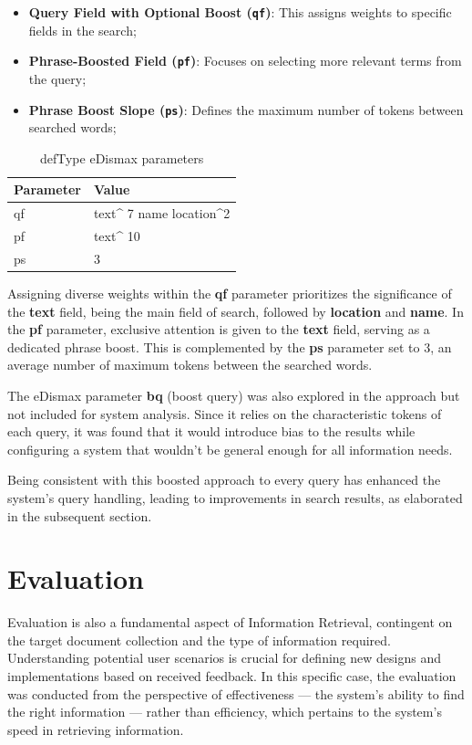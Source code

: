 \documentclass[sigconf]{acmart}
\begin{document}
\begin{itemize}
    \item \textbf{Query Field with Optional Boost (\texttt{qf})}: This assigns weights to specific fields in the search;
    \item \textbf{Phrase-Boosted Field (\texttt{pf})}: Focuses on selecting more relevant terms from the query;
    \item \textbf{Phrase Boost Slope (\texttt{ps})}: Defines the maximum number of tokens between searched words;
\end{itemize}

\begin{table}[H]
\small
\caption{defType eDismax parameters}
\label{tab:edismax_par}
\begin{tabular}{ll}
\toprule
Parameter & Value\\
\midrule
qf & text\textasciicircum{} 7 name location\textasciicircum{}2
  \\
pf & text\textasciicircum{} 10 \\
ps & 3 \\
\bottomrule
\end{tabular}
\end{table}

Assigning diverse weights within the \textbf{qf} parameter prioritizes the significance of the \textbf{text} field, being the main field of search, followed by \textbf{location} and \textbf{name}. In the \textbf{pf} parameter, exclusive attention is given to the \textbf{text} field, serving as a dedicated phrase boost. This is complemented by the \textbf{ps} parameter set to 3, an average number of maximum tokens between the searched words.

The eDismax parameter \textbf{bq} (boost query) was also explored in the approach but not included for system analysis. Since it relies on the characteristic tokens of each query, it was found that it would introduce bias to the results while configuring a system that wouldn't be general enough for all information needs.

Being consistent with this boosted approach to every query has enhanced the system's query handling, leading to improvements in search results, as elaborated in the subsequent section.

\section{ Evaluation }

Evaluation is also a fundamental aspect of Information Retrieval, contingent on the target document collection and the type of information required. Understanding potential user scenarios is crucial for defining new designs and implementations based on received feedback. In this specific case, the evaluation was conducted from the perspective of effectiveness — the system's ability to find the right information — rather than efficiency, which pertains to the system's speed in retrieving information.
\end{document}
